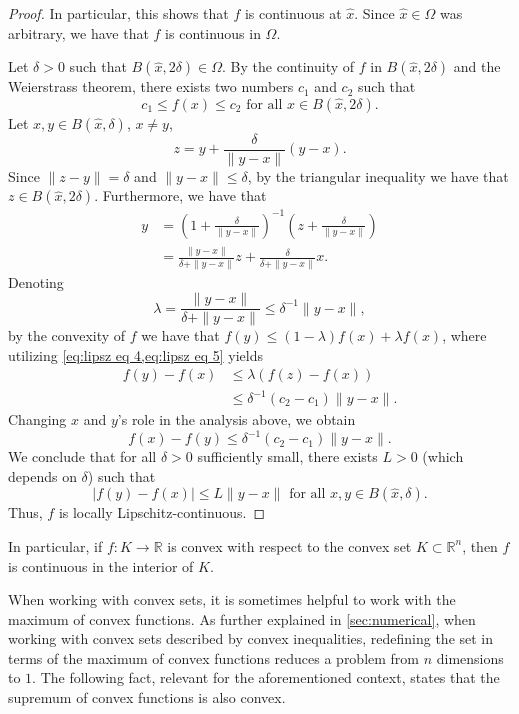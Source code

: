 \documentclass[smallextended,numbook,nospthms]{svjour3}
\theoremstyle{plain}
\theoremstyle{definition}
\def\RR{\mathds R}
\begin{document}
\begin{proof}
	In particular, this shows that $f$ is continuous at $\hat{x}$. Since $\hat{x} \in \Omega$ was arbitrary, we have that $f$ is continuous in $\Omega$.
	
	Let $\delta > 0$ such that $B(\hat{x},2\delta) \in \Omega$. By the continuity of $f$ in $B(\hat{x}, 2\delta)$ and the Weierstrass theorem, there exists two numbers $c_1$ and $c_2$ such that
	\[
	c_1 \leq f(x) \leq c_2 \text{ for all } x \in B(\hat{x},2\delta). \label{eq:lipsz eq 4}
	\]
	Let $x,y \in B(\hat{x},\delta)$, $x \not= y$,
	\[
	z=y+\frac{\delta}{\|y-x\|}(y-x).
	\]
	Since $\|z-y\|=\delta$ and $\|y-x\|\leq\delta$, by the triangular inequality we have that $z \in B(\hat{x},2\delta)$. Furthermore, we have that
	\begin{align}
		y &= \left(1+\frac{\delta}{\|y-x\|}\right)^{-1}\left(z+\frac{\delta}{\|y-x \|}\right) \\
		&= \frac{\|y-x\|}{\delta + \|y-x\|}z + \frac{\delta}{\delta+\|y-x\|}x.
	\end{align}
	Denoting
	\[
	\lambda=\frac{\|y-x\|}{\delta + \|y-x\|} \leq \delta^{-1}\|y-x\|,  \label{eq:lipsz eq 5}
	\]
	by the convexity of $f$ we have that $f(y) \leq (1-\lambda)f(x)+\lambda f(x)$, where utilizing \cref{eq:lipsz eq 4,eq:lipsz eq 5} yields
	\begin{align}
		f(y)-f(x) &\leq \lambda\left(f(z)-f(x)\right) \\
		&\leq \delta^{-1}(c_2 - c_1)\|y-x\|.
	\end{align}
	Changing $x$ and $y$'s role in the analysis above, we obtain
	\[
	f(x)-f(y) \leq \delta^{-1}(c_2 - c_1)\|y-x\|.
	\]
	We conclude that for all $\delta >0$ sufficiently small, there exists $L > 0$ (which depends on $\delta$) such that
	\[
	|f(y)-f(x)| \leq L \|y-x\| \text{ for all } x,y \in B(\hat{x},\delta).
	\]
	Thus, $f$ is locally Lipschitz-continuous.
\end{proof}
In particular, if $f:K \rightarrow \RR$ is convex with respect to the convex set $K \subset \RR^n$, then $f$ is continuous in the interior of $K$.

When working with convex sets, it is sometimes helpful to work with the maximum of convex functions. As further explained in \cref{sec:numerical}, when working with convex sets described by convex inequalities, redefining the set in terms of the maximum of convex functions reduces a problem from $n$ dimensions to $1$. The following fact, relevant for the aforementioned context, states that the supremum of convex functions is also convex.
\end{document}
